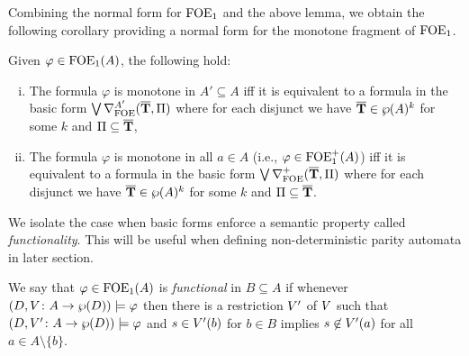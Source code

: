 Combining the normal form for $\ofoe$ and the above lemma, we obtain the following corollary providing a normal form for the monotone fragment of $\ofoe$.

\begin{corollary}\label{cor:ofoepositivenf}
	Given $\varphi \in \ofoe(A)$, the following hold:
	\begin{enumerate}[(i)]
		\item The formula $\varphi$ is monotone in $A'\subseteq A$ iff it is equivalent to a formula in the basic form $\bigvee \mondbnfofoe{\vlist{T}}{\Pi}{A'}$
		where
		for each disjunct we have $\vlist{T} \in \wp(A)^k$ for some $k$ and $\Pi\subseteq\vlist{T}$,
		\item The formula $\varphi$ is monotone in all $a\in A$ (i.e., $\varphi\in \ofoe^+(A)$) iff it is equivalent to a formula in the basic form $\bigvee \posdbnfofoe{\vlist{T}}{\Pi}$
		where
		for each disjunct we have $\vlist{T} \in \wp(A)^k$ for some $k$ and $\Pi\subseteq\vlist{T}$.
	\end{enumerate}
\end{corollary}

We isolate the case when basic forms enforce a semantic property called \emph{functionality}. This will be useful when defining non-deterministic parity automata in later section.

\begin{definition}\label{def:functionalsentenceofoe}
We say that $\varphi \in \ofoe(A)$ is \emph{functional} in $B\subseteq A$ if whenever $(D,\val \: A \to \wp(D)) \models \varphi$ then there is a restriction $\val'$ of $\val$ such that $(D,\val' \: A \to \wp(D)) \models \varphi$ and $s \in \val'(b)$ for $b \in B$ implies $s \not\in \val'(a)$ for all $a \in A\setminus\{b\}$.
\end{definition}

